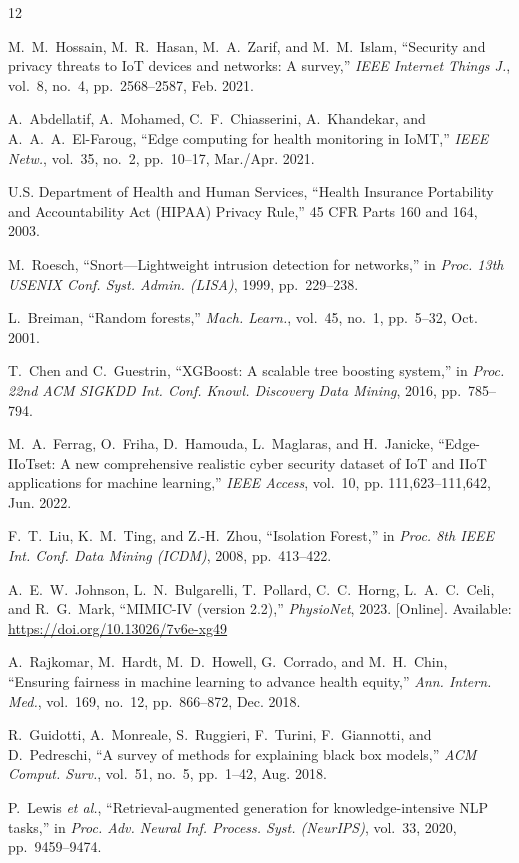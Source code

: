 \documentclass[conference]{IEEEtran}
\begin{document}
\begin{thebibliography}{12}

M.~M.~Hossain, M.~R.~Hasan, M.~A.~Zarif, and M.~M.~Islam, ``Security and privacy threats to IoT devices and networks: A survey,'' \textit{IEEE Internet Things J.}, vol.~8, no.~4, pp.~2568--2587, Feb. 2021.

A.~Abdellatif, A.~Mohamed, C.~F.~Chiasserini, A.~Khandekar, and A.~A.~A.~El-Faroug, ``Edge computing for health monitoring in IoMT,'' \textit{IEEE Netw.}, vol.~35, no.~2, pp.~10--17, Mar./Apr. 2021.

U.S. Department of Health and Human Services, ``Health Insurance Portability and Accountability Act (HIPAA) Privacy Rule,'' 45 CFR Parts 160 and 164, 2003.

M.~Roesch, ``Snort---Lightweight intrusion detection for networks,'' in \textit{Proc. 13th USENIX Conf. Syst. Admin. (LISA)}, 1999, pp.~229--238.

L.~Breiman, ``Random forests,'' \textit{Mach. Learn.}, vol.~45, no.~1, pp.~5--32, Oct. 2001.

T.~Chen and C.~Guestrin, ``XGBoost: A scalable tree boosting system,'' in \textit{Proc. 22nd ACM SIGKDD Int. Conf. Knowl. Discovery Data Mining}, 2016, pp.~785--794.

M.~A.~Ferrag, O.~Friha, D.~Hamouda, L.~Maglaras, and H.~Janicke, ``Edge-IIoTset: A new comprehensive realistic cyber security dataset of IoT and IIoT applications for machine learning,'' \textit{IEEE Access}, vol.~10, pp. 111{,}623--111{,}642, Jun. 2022.

F.~T.~Liu, K.~M.~Ting, and Z.-H.~Zhou, ``Isolation Forest,'' in \textit{Proc. 8th IEEE Int. Conf. Data Mining (ICDM)}, 2008, pp.~413--422.

A.~E.~W.~Johnson, L.~N.~Bulgarelli, T.~Pollard, C.~C.~Horng, L.~A.~C.~Celi, and R.~G.~Mark, ``MIMIC-IV (version 2.2),'' \textit{PhysioNet}, 2023. [Online]. Available: \url{https://doi.org/10.13026/7v6e-xg49}

A.~Rajkomar, M.~Hardt, M.~D.~Howell, G.~Corrado, and M.~H.~Chin, ``Ensuring fairness in machine learning to advance health equity,'' \textit{Ann. Intern. Med.}, vol.~169, no.~12, pp.~866--872, Dec. 2018.

R.~Guidotti, A.~Monreale, S.~Ruggieri, F.~Turini, F.~Giannotti, and D.~Pedreschi, ``A survey of methods for explaining black box models,'' \textit{ACM Comput. Surv.}, vol.~51, no.~5, pp.~1--42, Aug. 2018.

P.~Lewis \textit{et al.}, ``Retrieval-augmented generation for knowledge-intensive NLP tasks,'' in \textit{Proc. Adv. Neural Inf. Process. Syst. (NeurIPS)}, vol.~33, 2020, pp.~9459--9474.

\end{thebibliography}
\end{document}
